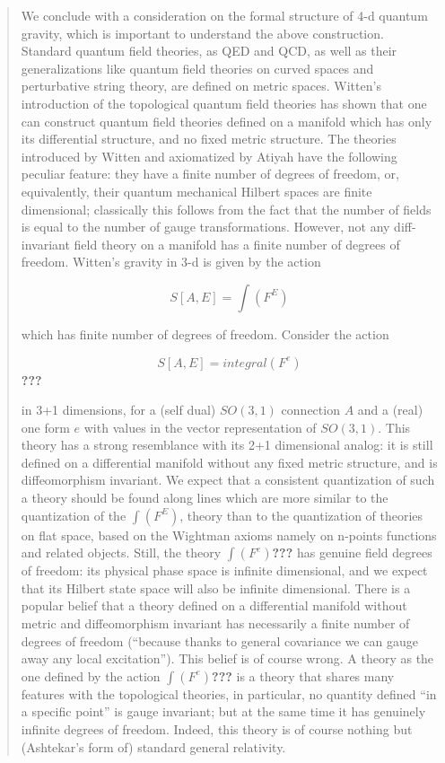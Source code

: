 \documentclass{article}
\begin{document}
\begin{quote}
We conclude with a consideration on the formal structure of 4-d quantum
gravity, which is important to understand the above construction.
Standard quantum field theories, as QED and QCD, as well as their
generalizations like quantum field theories on curved spaces and
perturbative string theory, are defined on metric spaces. Witten's
introduction of the topological quantum field theories has shown that
one can construct quantum field theories defined on a manifold which has
only its differential structure, and no fixed metric structure. The
theories introduced by Witten and axiomatized by Atiyah have the
following peculiar feature: they have a finite number of degrees of
freedom, or, equivalently, their quantum mechanical Hilbert spaces are
finite dimensional; classically this follows from the fact that the
number of fields is equal to the number of gauge transformations.
However, not any diff-invariant field theory on a manifold has a finite
number of degrees of freedom. Witten's gravity in 3-d is given by the
action

\[S[A,E] = \int(F^E)\]

which has finite number of degrees of freedom. Consider the action

\[S[A,E] = integral(F^e)\]\textbf{???}

in 3+1 dimensions, for a (self dual) \(SO(3,1)\) connection \(A\) and a
(real) one form \(e\) with values in the vector representation of
\(SO(3,1)\). This theory has a strong resemblance with its 2+1
dimensional analog: it is still defined on a differential manifold
without any fixed metric structure, and is diffeomorphism invariant. We
expect that a consistent quantization of such a theory should be found
along lines which are more similar to the quantization of the
\(\int(F^E)\), theory than to the quantization of theories on flat
space, based on the Wightman axioms namely on n-points functions and
related objects. Still, the theory \(\int(F^e)\)\textbf{???} has genuine
field degrees of freedom: its physical phase space is infinite
dimensional, and we expect that its Hilbert state space will also be
infinite dimensional. There is a popular belief that a theory defined on
a differential manifold without metric and diffeomorphism invariant has
necessarily a finite number of degrees of freedom (``because thanks to
general covariance we can gauge away any local excitation''). This
belief is of course wrong. A theory as the one defined by the action
\(\int(F^e)\)\textbf{???} is a theory that shares many features with the
topological theories, in particular, no quantity defined ``in a specific
point'' is gauge invariant; but at the same time it has genuinely
infinite degrees of freedom. Indeed, this theory is of course nothing
but (Ashtekar's form of) standard general relativity.


\end{quote}
\end{document}
